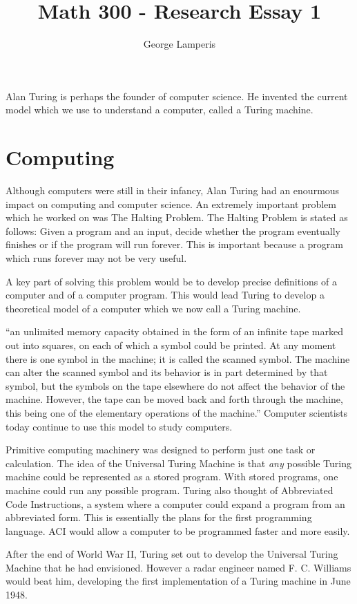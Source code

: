 \documentclass[12pt]{article}
\title{Math 300 - Research Essay 1}
\author{George Lamperis}
\date{}
\theoremstyle{mystyle}
\begin{document}
\maketitle


Alan Turing is perhaps the founder of computer science. He invented the current
model which we use to understand a computer, called a Turing machine. 

\section{Computing}

Although computers were still in their infancy, Alan Turing had an enourmous
impact on computing and computer science. An extremely important problem which
he worked on was The Halting Problem. The Halting Problem is stated as follows:
Given a program and an input, decide whether the program eventually finishes or
if the program will run forever. This is important because a program which runs
forever may not be very useful.

A key part of solving this problem would be to develop precise definitions of a
computer and of a computer program. This would lead Turing to develop a
theoretical model of a computer which we now call a Turing machine. 

``an unlimited memory capacity obtained in the form of an infinite tape marked out
into squares, on each of which a symbol could be printed. At any moment there is
one symbol in the machine; it is called the scanned symbol. The machine can
alter the scanned symbol and its behavior is in part determined by that symbol,
but the symbols on the tape elsewhere do not affect the behavior of the machine.
However, the tape can be moved back and forth through the machine, this being 
one of the elementary operations of the machine.'' Computer scientists today
continue to use this model to study computers.

Primitive computing machinery was designed to perform just one task or
calculation. The idea of the Universal Turing Machine is that \emph{any}
possible Turing machine could be represented as a stored program. With stored
programs, one machine could run any possible program. Turing also thought of
Abbreviated Code Instructions, a system where a computer could expand a program
from an abbreviated form. This is essentially the plans for the first
programming language. ACI would allow a computer to be programmed faster and
more easily.

After the end of World War II, Turing set out to develop the Universal Turing
Machine that he had envisioned. However a radar engineer named F. C. Williams
would beat him, developing the first implementation of a Turing machine in June
1948.
\end{document}
